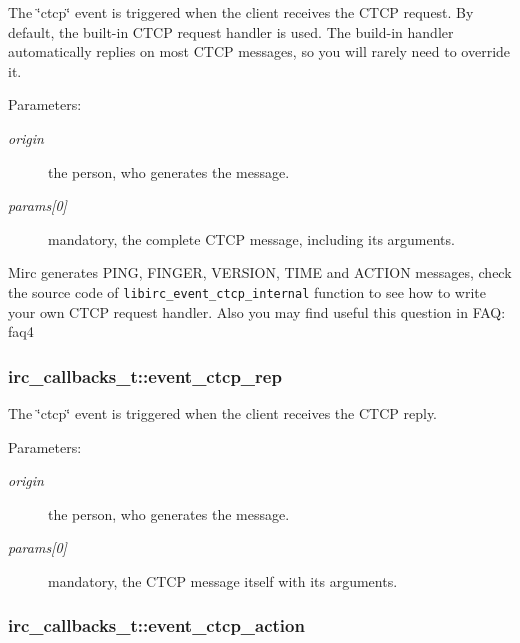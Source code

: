 The \char`\"{}ctcp\char`\"{} event is triggered when the client receives the CTCP request. By default, the built-in CTCP request handler is used. The build-in handler automatically replies on most CTCP messages, so you will rarely need to override it.

\begin{Desc}
\item[Parameters:]
\begin{description}
\item[{\em origin}]the person, who generates the message. \item[{\em params\mbox{[}0\mbox{]}}]mandatory, the complete CTCP message, including its arguments.\end{description}
\end{Desc}
Mirc generates PING, FINGER, VERSION, TIME and ACTION messages, check the source code of {\tt libirc\_\-event\_\-ctcp\_\-internal} function to see how to write your own CTCP request handler. Also you may find useful this question in FAQ: faq4 \hypertarget{structirc__callbacks__t_1e967e7534502bce5434dd4d4415bdd8}{
\subsubsection[event\_\-ctcp\_\-rep]{ {\bf irc\_\-callbacks\_\-t::event\_\-ctcp\_\-rep}}}
\label{structirc__callbacks__t_1e967e7534502bce5434dd4d4415bdd8}


The \char`\"{}ctcp\char`\"{} event is triggered when the client receives the CTCP reply.

\begin{Desc}
\item[Parameters:]
\begin{description}
\item[{\em origin}]the person, who generates the message. \item[{\em params\mbox{[}0\mbox{]}}]mandatory, the CTCP message itself with its arguments. \end{description}
\end{Desc}
\hypertarget{structirc__callbacks__t_522d1cf8dc01b66efc03d31e3787e11f}{
\subsubsection[event\_\-ctcp\_\-action]{ {\bf irc\_\-callbacks\_\-t::event\_\-ctcp\_\-action}}}
\label{structirc__callbacks__t_522d1cf8dc01b66efc03d31e3787e11f}



